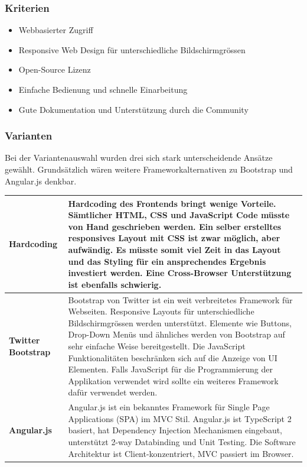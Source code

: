 \subsubsection{Kriterien}
\begin{itemize}
\item Webbasierter Zugriff
\item Responsive Web Design für unterschiedliche Bildschirmgrössen
\item Open-Source Lizenz
\item Einfache Bedienung und schnelle Einarbeitung
\item Gute Dokumentation und Unterstützung durch die Community
\end{itemize}

\subsubsection{Varianten}
Bei der Variantenauswahl wurden drei sich stark unterscheidende Ansätze gewählt. Grundsätzlich wären weitere Frameworkalternativen zu Bootstrap und Angular.js denkbar.

\begin{longtable}{| p{4cm} | p{11.7cm} |}
 \hline
  \textbf{Hardcoding} & Hardcoding des Frontends bringt wenige Vorteile. Sämtlicher HTML, CSS und JavaScript Code müsste von Hand geschrieben werden. Ein selber erstelltes responsives Layout mit CSS ist zwar möglich, aber aufwändig. Es müsste somit viel Zeit in das Layout und das Styling für ein ansprechendes Ergebnis investiert werden. Eine Cross-Browser Unterstützung ist ebenfalls schwierig.\\ \hline 
 \textbf{Twitter Bootstrap} & Bootstrap von Twitter ist ein weit verbreitetes Framework für Webseiten. Responsive Layouts für unterschiedliche Bildschirmgrössen werden unterstützt. Elemente wie Buttons, Drop-Down Menüs und ähnliches werden von Bootstrap auf sehr einfache Weise bereitgestellt. Die JavaScript Funktionalitäten beschränken sich auf die Anzeige von UI Elementen. Falls JavaScript für die Programmierung der Applikation verwendet wird sollte ein weiteres Framework dafür verwendet werden.\\ \hline 
 \textbf{Angular.js} & Angular.js ist ein bekanntes Framework für Single Page Applications (SPA) im MVC Stil. Angular.js ist TypeScript 2 basiert, hat Dependency Injection Mechanismen eingebaut, unterstützt 2-way Databinding und Unit Testing. Die Software Architektur ist Client-konzentriert, MVC passiert im Browser.\\ \hline
\end{longtable}

